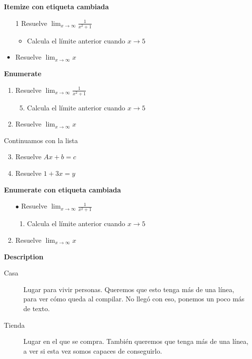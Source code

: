 \documentclass[10pt,a4paper]{article}
\begin{document}
\textbf{Itemize con etiqueta cambiada}
\begin{itemize}
	\item[1] Resuelve $\lim_{x\to \infty}\frac{1}{x^2+1}$
		\begin{itemize}
			\item Calcula el límite anterior cuando $x\to 5$
		\end{itemize} 
	\item Resuelve $\lim_{x\to \infty} x$
\end{itemize}

\textbf{Enumerate}
\begin{enumerate}
	\item Resuelve $\lim_{x\to \infty}\frac{1}{x^2+1}$
	\begin{enumerate} \setcounter{enumii}{4} %
		\item Calcula el límite anterior cuando $x\to 5$
	\end{enumerate} 
	\item Resuelve $\lim_{x\to \infty} x$
\end{enumerate}

Continuamos con la lista

\begin{enumerate} \setcounter{enumi}{2} %
	\item Resuelve $Ax+b=c$
	\item Resuelve $1+3x=y$
\end{enumerate}

\textbf{Enumerate con etiqueta cambiada}
\begin{enumerate}
	\item[$\bullet$]Resuelve $\lim_{x\to \infty}\frac{1}{x^2+1}$
	\begin{enumerate}
		\item Calcula el límite anterior cuando $x\to 5$
	\end{enumerate} 
	\item Resuelve $\lim_{x\to \infty} x$
\end{enumerate}

\textbf{Description}
\begin{description}
	\item[Casa] Lugar para vivir personas. Queremos que esto tenga más de una línea, para ver cómo queda al compilar. No llegó con eso, ponemos un poco más de texto.
	\item[Tienda] Lugar en el que se compra. También queremos que tenga más de una línea, a ver si esta vez somos capaces de conseguirlo.
	
\end{description}
\end{document}
